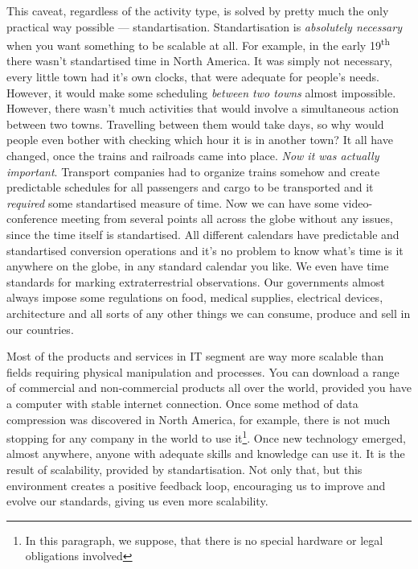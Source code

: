 \documentclass{report}
\begin{document}
            This caveat, regardless of the activity type, is solved by pretty much the only practical way possible --- standartisation. Standartisation 
            is \emph{absolutely necessary} when you want something to be scalable at all. For example, in the early 19\textsuperscript{th} there wasn't standartised time 
            in North America. It was simply not necessary, every little town had it's own clocks, that were adequate for people's needs. However, it would make some 
            scheduling \emph{between two towns} almost impossible. However, there wasn't much activities that would involve a simultaneous action between two towns. 
            Travelling between them would take days, so why would people even bother with checking which hour it is in another town? It all have changed, once the trains
            and railroads came into place. \emph{Now it was actually important}. Transport companies had to organize trains somehow and create predictable schedules for all
            passengers and cargo to be transported and it \emph{required} some standartised measure of time. Now we can have some video-conference meeting from several points 
            all across the globe without any issues, since the time itself is standartised. All different calendars have predictable and standartised conversion operations and
            it's no problem to know what's time is it anywhere on the globe, in any standard calendar you like. We even have time standards for marking extraterrestrial observations. 
            Our governments almost always impose some regulations on food, medical supplies, electrical devices, architecture and all sorts of any other things we can consume, 
            produce and sell in our countries.\par

            Most of the products and services in IT segment are way more scalable than fields requiring physical manipulation and processes. You can download a range of
            commercial and non-commercial products all over the world, provided you have a computer with stable internet connection. Once some method of data compression 
            was discovered in North America, for example, there is not much stopping for any company in the world to use it\footnote{In this paragraph, we suppose, that 
            there is no special hardware or legal obligations involved}. Once new technology emerged, almost anywhere, anyone with adequate skills and knowledge can use it.
            It is the result of scalability, provided by standartisation. Not only that, but this environment creates a positive feedback loop, encouraging us to 
            improve and evolve our standards, giving us even more scalability.\par
            
\end{document}
